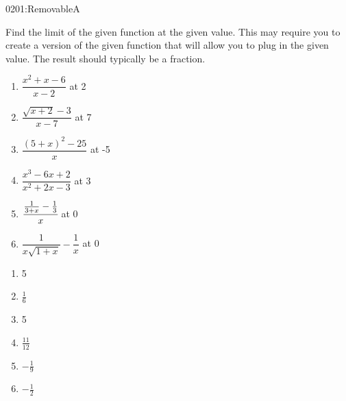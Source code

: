 \begin{defproblem}{0201:RemovableA}
\begin{onlyproblem}
\begin{exercise}
Find the limit of the given function at the given value.
This may require you to create a version of the given function that will 
allow you to plug in the given value.
The result should typically be a fraction.
\begin{enumerate}[itemsep=4pt,parsep=4pt]
\item $\dfrac{x^2+x-6}{x-2}$ at 2
\item $\dfrac{\sqrt{x+2}-3}{x-7}$ at 7
\item $\dfrac{(5+x)^2-25}{x}$ at -5
\item $\dfrac{x^3-6x+2}{x^2+2x-3}$ at 3
\item $\cfrac{\frac{1}{3+x} - \frac{1}{3}}{x}$ at 0
\item $\dfrac{1}{x\sqrt{1+x}}-\dfrac{1}{x}$ at 0
\end{enumerate}
\end{exercise}
\end{onlyproblem}
\begin{onlysolution}
\begin{enumerate}
\item 5
\item $\frac{1}{6}$
\item 5
\item $\frac{11}{12}$
\item $-\frac{1}{9}$
\item $-\frac{1}{2}$
\end{enumerate}
\end{onlysolution}
\end{defproblem}


